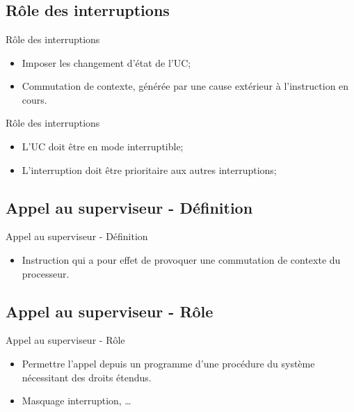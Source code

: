 \section{\sectitle}
\begin{frame}{\sectitle}
\def\subsectitle{Rôle des interruptions}
\subsection{\subsectitle}
\begin{block}{\subsectitle}
\begin{itemize}
    \item Imposer les changement d'état de l'UC;
    \item Commutation de contexte, générée par une cause extérieur à
    l'instruction en cours.
\end{itemize}
\end{block}

\begin{alertblock}{\subsectitle}
\begin{itemize}
    \item L'UC doit être en mode interruptible;
    \item L'interruption doit être prioritaire aux autres interruptions;
\end{itemize}
\end{alertblock}

\end{frame}

\begin{frame}{\sectitle}
\def\subsectitle{Appel au superviseur - Définition}
\subsection{\subsectitle}

\begin{exampleblock}{\subsectitle}
\begin{itemize}
    \item Instruction qui a pour effet de provoquer une commutation de contexte
    du processeur.
\end{itemize}
\end{exampleblock}

\def\subsectitle{Appel au superviseur - Rôle}
\subsection{\subsectitle}
\begin{block}{\subsectitle}
\begin{itemize}
    \item Permettre l'appel depuis un programme d'une procédure du système
    nécessitant des droits étendus.
    \item Masquage interruption, \dots
\end{itemize}
\end{block}
\end{frame}


